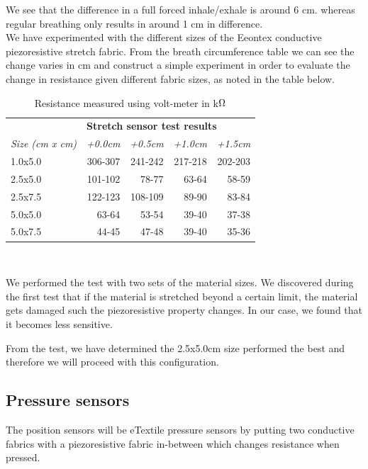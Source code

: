 \documentclass{sigchi-ext}
\begin{document}
We see that the difference in a full forced inhale/exhale is around 6 cm. whereas regular
breathing only results in around 1 cm in difference.\\
We have experimented with the different sizes of the Eeontex conductive piezoresistive
stretch fabric. From the breath circumference table we can see the change varies in cm and construct a simple experiment in order to evaluate the change in resistance given
different fabric sizes, as noted in the table below.
\begin{table}[H]
  \centering
  \begin{tabular}{l r r r r}
    & \multicolumn{4}{l}{\small{\textbf{Stretch sensor test results}}} \\
    \cmidrule(r){2-4}
    {\small\textit{Size (cm x cm)}}
    & {\small \textit{+0.0cm}}
    & {\small \textit{+0.5cm}}
    & {\small \textit{+1.0cm}}
    & {\small \textit{+1.5cm}} \\
    \midrule
    1.0x5.0    & 306-307 & 241-242 & 217-218 & 202-203\\
    2.5x5.0    & 101-102 & 78-77 & 63-64 & 58-59 \\
    2.5x7.5    & 122-123 & 108-109 & 89-90 & 83-84 \\
    5.0x5.0    & 63-64 & 53-54 & 39-40 & 37-38 \\
    5.0x7.5    & 44-45 & 47-48 & 39-40 & 35-36 \\
  \end{tabular}
  \caption{Resistance measured using volt-meter in k$\ohm$}~\label{tab:stretch-test}
\end{table}
We performed the test with two sets of the material sizes.
We discovered during the first test that if the material
is stretched beyond a certain limit, the material gets
damaged such the piezoresistive property changes. In our case,
we found that it becomes less sensitive.

From the test, we have determined the 2.5x5.0cm size
performed the best and therefore we will proceed with this
configuration.

\clearpage

\subsection{Pressure sensors}
The position sensors will be eTextile pressure sensors by putting two conductive
fabrics with a piezoresistive fabric in-between which changes resistance when
pressed.
\end{document}
